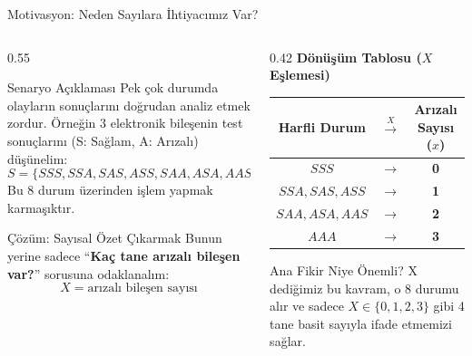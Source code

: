 \documentclass[light]{lutbeamer}
\begin{document}

\begin{frame}{Motivasyon: Neden Sayılara İhtiyacımız Var?}
\footnotesize
\begin{columns}[T]
  \begin{column}{0.55\textwidth}
    \begin{block}{Senaryo Açıklaması}
      Pek çok durumda olayların sonuçlarını doğrudan analiz etmek zordur. Örneğin 3 elektronik bileşenin test sonuçlarını (S: Sağlam, A: Arızalı) düşünelim:
      \[
      S = \{SSS, SSA, SAS, ASS, SAA, ASA, AAS, AAA\}
      \]
      Bu 8 durum üzerinden işlem yapmak karmaşıktır.
    \end{block}

    \begin{block}{Çözüm: Sayısal Özet Çıkarmak}
      Bunun yerine sadece ``\textbf{Kaç tane arızalı bileşen var?}'' sorusuna odaklanalım:
      \[
      X = \text{arızalı bileşen sayısı}
      \] 
    \end{block}
  \end{column}
  \begin{column}{0.42\textwidth}
    \centering
    \textbf{Dönüşüm Tablosu ($X$ Eşlemesi)}
    \vspace{0.15cm}
    
    \begin{tabular}{c c c}
      \toprule
      Harfli Durum & $\xrightarrow{X}$ & Arızalı Sayısı ($x$) \\
      \midrule
      $SSS$ & $\rightarrow$ & \textbf{0} \\
      $SSA, SAS, ASS$ & $\rightarrow$ & \textbf{1} \\
      $SAA, ASA, AAS$ & $\rightarrow$ & \textbf{2} \\
      $AAA$ & $\rightarrow$ & \textbf{3} \\
      \bottomrule
    \end{tabular}
    
    \vspace{0.4cm}
    \begin{alertblock}{Ana Fikir Niye Önemli?}
      X dediğimiz bu kavram, o 8 durumu alır ve sadece $X \in \{0, 1, 2, 3\}$ gibi 4 tane basit sayıyla ifade etmemizi sağlar.
    \end{alertblock}
  \end{column}
\end{columns}
\end{frame}
\end{document}
